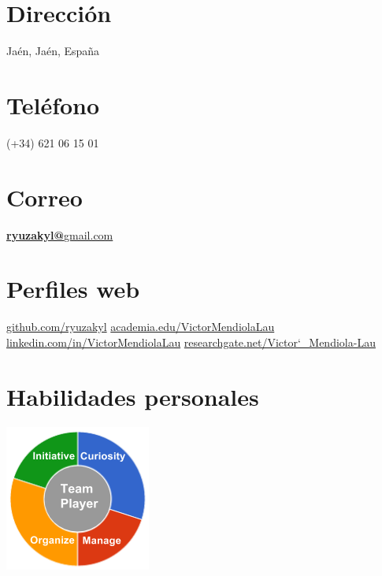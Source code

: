 \documentclass[]{friggeri-cv}
\begin{document}
      

\begin{aside}
  \section{Dirección}
    Jaén, Jaén, España
    ~
    ~
    ~
  \section{Teléfono}
    (+34) 621 06 15 01
    ~
    ~
    ~
  \section{Correo}
    \href{mailto:ryuzakyl@gmail.com}{\textbf{ryuzakyl@}gmail.com}
	~
	~    
    ~
  \section{Perfiles web}
    \href{https://github.com/ryuzakyl}{{\scriptsize github.com/ryuzakyl}}
    \href{https://independent.academia.edu/VictorMendiolaLau}{{\scriptsize academia.edu/VictorMendiolaLau}}
    \href{https://www.linkedin.com/in/VictorMendiolaLau}{{\scriptsize linkedin.com/in/VictorMendiolaLau}}
	\href{https://www.researchgate.net/profile/Victor_Mendiola-Lau}{{\scriptsize researchgate.net/Victor\char`_Mendiola-Lau}}
    ~
    ~
    ~
  \section{Habilidades personales}
    \includegraphics[scale=0.62]{img/personal.png}
    ~
\end{aside}
\end{document}
